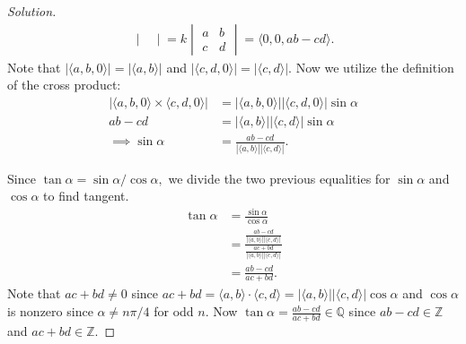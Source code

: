 \documentclass[12pt]{article}
\newcommand{\Z}{\mathbb{Z}}
\newcommand{\Q}{\mathbb{Q}}
\newenvironment{exercise}[2][Exercise]{\begin{trivlist}
        \item[\hskip \labelsep {\bfseries #1}\hskip \labelsep {\bfseries #2.}]}{\end{trivlist}}
\newenvironment{solution}
        {\begin{proof}[Solution]}
                    {\end{proof}}
\begin{document}
\begin{exercise}{6}
\begin{solution}
\begin{align*}
\begin{vmatrix}
            \end{vmatrix} = k\begin{vmatrix}
                a & b\\
                c & d
            \end{vmatrix}= \langle 0,0,ab-cd \rangle.
        \end{align*}
        Note that \( \left| \langle a,b,0 \rangle \right| = \left| \langle a,b \rangle \right| \) and \( \left| \langle c,d,0 \rangle \right| = \left| \langle c,d \rangle \right| . \) Now we utilize the definition of the cross product:
        \begin{align*}
            \left| \langle a,b,0 \rangle \times \langle c,d,0 \rangle \right| &= \left| \langle a,b,0 \rangle \right| \left| \langle c,d,0 \rangle \right| \sin\alpha\\
            ab-cd &= \left| \langle a,b \rangle \right| \left| \langle c,d \rangle \right|\sin\alpha\\
            \implies \sin\alpha &= \frac{ab-cd}{\left| \langle a,b \rangle \right| \left| \langle c,d \rangle \right|}.
        \end{align*}\pagebreak

        Since \( \tan\alpha = \sin\alpha/\cos\alpha, \) we divide the two previous equalities for \( \sin\alpha \) and \( \cos\alpha \) to find tangent.
        \begin{align*}
            \tan\alpha &= \frac{\sin\alpha}{\cos\alpha}\\
            &= \frac{\displaystyle\frac{ab-cd}{\left| \langle a,b \rangle \right| \left| \langle c,d \rangle \right|}}{\displaystyle\frac{ac+bd}{\left| \langle a,b \rangle \right| \left| \langle c,d \rangle \right|}}\\
            &= \frac{ab-cd}{ac+bd}.
        \end{align*}
        Note that \( ac+bd\neq0 \) since \( ac+bd = \langle a,b \rangle \cdot \langle c,d \rangle = \left| \langle a,b \rangle \right| \left| \langle c,d \rangle \right| \cos\alpha\) and \( \cos\alpha \) is nonzero since \( \alpha \neq n\pi/4 \) for odd \( n \). Now \( \tan\alpha = \frac{ab-cd}{ac+bd} \in \Q \) since \( ab-cd \in \Z \) and \( ac+bd \in \Z. \)
    \end{solution}
\end{exercise}
\end{document}
